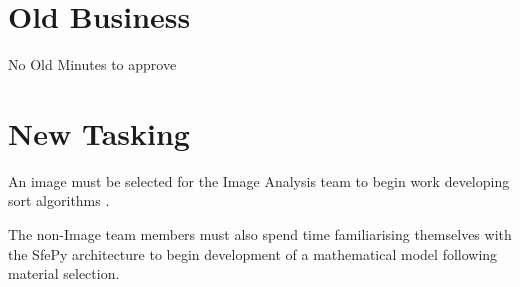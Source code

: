 \documentclass[11pt]{meetingmins}
\begin{document}
	\section{Old Business}
	\begin{items}
		\item
		No Old Minutes to approve
	\end{items}
	
	\section{New Tasking}
	\begin{items}
		\item
		An image must be selected for the Image Analysis team to begin work developing sort algorithms .
		
		\item
		The non-Image team members must also spend time familiarising themselves with the SfePy architecture to begin development of a mathematical model following material selection.
	\end{items}
	
	\vspace{1em}
	
\end{document}
